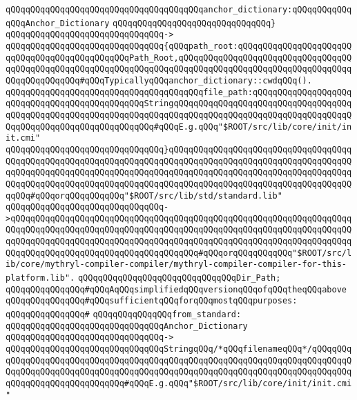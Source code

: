 \verb|qQQqqQQqqQQqqQQqqQQqqQQqqQQqqQQqqQQqqQQqanchor_dictionary:qQQqqQQqqQQqqQQqAnchor_Dictionary|\newline
\verb|qQQqqQQqqQQqqQQqqQQqqQQqqQQqqQQq}|\newline
\verb|qQQqqQQqqQQqqQQqqQQqqQQqqQQqqQQq->|\newline
\verb|qQQqqQQqqQQqqQQqqQQqqQQqqQQqqQQq{qQQqpath_root:qQQqqQQqqQQqqQQqqQQqqQQqqQQqqQQqqQQqqQQqqQQqqQQqPath_Root,qQQqqQQqqQQqqQQqqQQqqQQqqQQqqQQqqQQqqQQqqQQqqQQqqQQqqQQqqQQqqQQqqQQqqQQqqQQqqQQqqQQqqQQqqQQqqQQqqQQqqQQqqQQqqQQqqQQqqQQq#qQQqTypicallyqQQqanchor_dictionary::cwdqQQq().|\newline
\verb|qQQqqQQqqQQqqQQqqQQqqQQqqQQqqQQqqQQqqQQqfile_path:qQQqqQQqqQQqqQQqqQQqqQQqqQQqqQQqqQQqqQQqqQQqqQQqStringqQQqqQQqqQQqqQQqqQQqqQQqqQQqqQQqqQQqqQQqqQQqqQQqqQQqqQQqqQQqqQQqqQQqqQQqqQQqqQQqqQQqqQQqqQQqqQQqqQQqqQQqqQQqqQQqqQQqqQQqqQQqqQQqqQQqqQQq#qQQqE.g.qQQq"$ROOT/src/lib/core/init/init.cmi"|\newline
\verb|qQQqqQQqqQQqqQQqqQQqqQQqqQQqqQQq}qQQqqQQqqQQqqQQqqQQqqQQqqQQqqQQqqQQqqQQqqQQqqQQqqQQqqQQqqQQqqQQqqQQqqQQqqQQqqQQqqQQqqQQqqQQqqQQqqQQqqQQqqQQqqQQqqQQqqQQqqQQqqQQqqQQqqQQqqQQqqQQqqQQqqQQqqQQqqQQqqQQqqQQqqQQqqQQqqQQqqQQqqQQqqQQqqQQqqQQqqQQqqQQqqQQqqQQqqQQqqQQqqQQqqQQqqQQqqQQqqQQqqQQqqQQq#qQQqorqQQqqQQqqQQq"$ROOT/src/lib/std/standard.lib"|\newline
\verb|qQQqqQQqqQQqqQQqqQQqqQQqqQQqqQQq->qQQqqQQqqQQqqQQqqQQqqQQqqQQqqQQqqQQqqQQqqQQqqQQqqQQqqQQqqQQqqQQqqQQqqQQqqQQqqQQqqQQqqQQqqQQqqQQqqQQqqQQqqQQqqQQqqQQqqQQqqQQqqQQqqQQqqQQqqQQqqQQqqQQqqQQqqQQqqQQqqQQqqQQqqQQqqQQqqQQqqQQqqQQqqQQqqQQqqQQqqQQqqQQqqQQqqQQqqQQqqQQqqQQqqQQqqQQqqQQqqQQqqQQq#qQQqorqQQqqQQqqQQq"$ROOT/src/lib/core/mythryl-compiler-compiler/mythryl-compiler-compiler-for-this-platform.lib".|\newline
\verb|qQQqqQQqqQQqqQQqqQQqqQQqqQQqqQQqDir_Path;|\newline
\newline
\verb|qQQqqQQqqQQqqQQq#qQQqAqQQqsimplifiedqQQqversionqQQqofqQQqtheqQQqabove|\newline
\verb|qQQqqQQqqQQqqQQq#qQQqsufficientqQQqforqQQqmostqQQqpurposes:|\newline
\verb|qQQqqQQqqQQqqQQq#|\newline
\verb|qQQqqQQqqQQqqQQqfrom_standard:|\newline
\verb|qQQqqQQqqQQqqQQqqQQqqQQqqQQqqQQqAnchor_Dictionary|\newline
\verb|qQQqqQQqqQQqqQQqqQQqqQQqqQQqqQQq->|\newline
\verb|qQQqqQQqqQQqqQQqqQQqqQQqqQQqqQQqStringqQQq/*qQQqfilenameqQQq*/qQQqqQQqqQQqqQQqqQQqqQQqqQQqqQQqqQQqqQQqqQQqqQQqqQQqqQQqqQQqqQQqqQQqqQQqqQQqqQQqqQQqqQQqqQQqqQQqqQQqqQQqqQQqqQQqqQQqqQQqqQQqqQQqqQQqqQQqqQQqqQQqqQQqqQQqqQQqqQQqqQQqqQQqqQQq#qQQqE.g.qQQq"$ROOT/src/lib/core/init/init.cmi"|\newline
